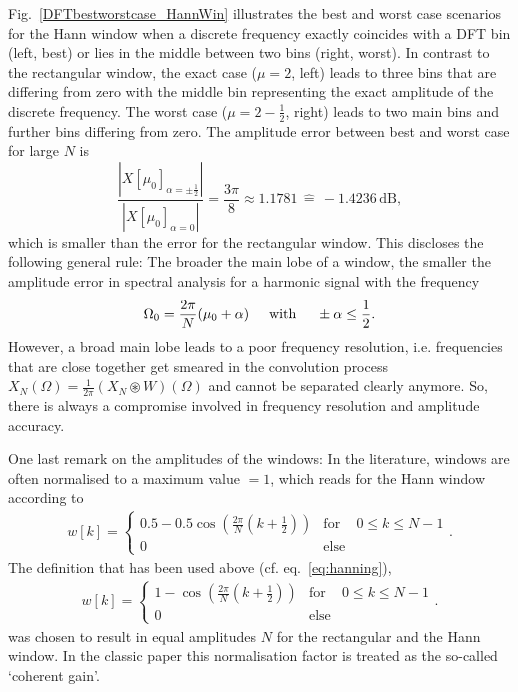 \documentclass[11pt,a4paper,DIV=12]{scrartcl}
\begin{document}
Fig.~\ref{DFTbestworstcase_HannWin} illustrates the best and worst case
scenarios for the Hann window when a discrete frequency exactly coincides
with a DFT bin (left, best) or lies in the middle between two bins (right, worst).
%
In contrast to the rectangular window, the exact case ($\mu=2$, left) leads to
three bins that are differing from zero with the middle bin representing the
exact amplitude of the discrete frequency.
%
The worst case ($\mu=2-\frac{1}{2}$, right) leads to two main bins and further
bins differing from zero.
%
The amplitude error between best and worst case for large $N$ is
%
\begin{equation}
\frac{\left|X[\mu_0]_{\alpha=\pm\frac{1}{2}}\right|}{\left|X[\mu_0]_{\alpha=0}\right|}=\frac{3\pi}{8}\approx1.1781\,\hat{=}\,-1.4236\,\text{dB},
\end{equation}
%
which is smaller than the error for the rectangular window.
%
This discloses the following general rule: The broader the main lobe of a window,
the smaller the amplitude error in spectral analysis for a harmonic signal with
the frequency
%
\begin{equation}
\Omega_0=\frac{2\pi}{N}(\mu_0+\alpha) \hspace{5mm} \text{with} \hspace{5mm} \pm\alpha\leq\frac{1}{2}.
\end{equation}
%
However, a broad main lobe leads to a poor frequency resolution, i.e.
frequencies that are close together get smeared in the convolution process
$X_N(\Omega)=\frac{1}{2\pi}(X_N\circledast W)(\Omega)$ and cannot be separated
clearly anymore. So, there is always a compromise involved in frequency
resolution and amplitude accuracy.

One last remark on the amplitudes of the windows: In the literature, windows
are often normalised to a maximum value $=1$, which reads for
the Hann window according to \cite{Moeser2011}
%
\begin{align}
w[k]=\left\{\begin{matrix}0.5-0.5\cos\left(\frac{2\pi}{N}\left(k+\frac{1}{2}\right)\right) & \text{for} & 0\leq k\leq N-1\\0 & \text{else} &\end{matrix}\right..
\end{align}
%
The definition that has been used above (cf. eq.~\eqref{eq:hanning}),
\begin{align}
w[k]=\left\{\begin{matrix}1-\cos\left(\frac{2\pi}{N}\left(k+\frac{1}{2}\right)\right) & \text{for} & 0\leq k\leq N-1\\0 & \text{else} &\end{matrix}\right..
\end{align}
was chosen to result in equal amplitudes $N$ for the rectangular and the Hann
window.
%
In the classic paper \cite[tab.~1]{Harris1978} this normalisation
factor is treated as the so-called `coherent gain'.
\end{document}
